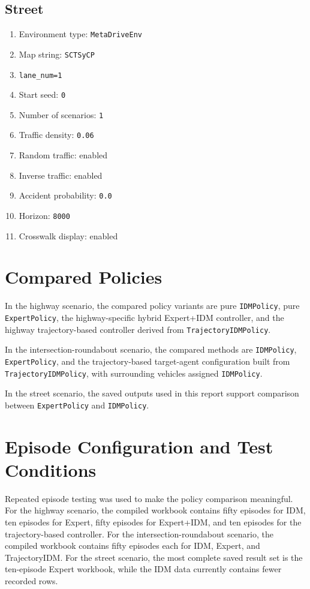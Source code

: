 \documentclass[12pt,a4paper]{report}
\begin{document}
\subsection{Street}
\begin{enumerate}[label=\arabic*.]
    \item Environment type: \texttt{MetaDriveEnv}
    \item Map string: \texttt{SCTSyCP}
    \item \texttt{lane\_num=1}
    \item Start seed: \texttt{0}
    \item Number of scenarios: \texttt{1}
    \item Traffic density: \texttt{0.06}
    \item Random traffic: enabled
    \item Inverse traffic: enabled
    \item Accident probability: \texttt{0.0}
    \item Horizon: \texttt{8000}
    \item Crosswalk display: enabled
\end{enumerate}

\section{Compared Policies}
In the highway scenario, the compared policy variants are pure \texttt{IDMPolicy}, pure \texttt{ExpertPolicy}, the highway-specific hybrid Expert+IDM controller, and the highway trajectory-based controller derived from \texttt{TrajectoryIDMPolicy}.

In the intersection-roundabout scenario, the compared methods are \texttt{IDMPolicy}, \texttt{ExpertPolicy}, and the trajectory-based target-agent configuration built from \texttt{TrajectoryIDMPolicy}, with surrounding vehicles assigned \texttt{IDMPolicy}.

In the street scenario, the saved outputs used in this report support comparison between \texttt{ExpertPolicy} and \texttt{IDMPolicy}.

\section{Episode Configuration and Test Conditions}
Repeated episode testing was used to make the policy comparison meaningful. For the highway scenario, the compiled workbook contains fifty episodes for IDM, ten episodes for Expert, fifty episodes for Expert+IDM, and ten episodes for the trajectory-based controller. For the intersection-roundabout scenario, the compiled workbook contains fifty episodes each for IDM, Expert, and TrajectoryIDM. For the street scenario, the most complete saved result set is the ten-episode Expert workbook, while the IDM data currently contains fewer recorded rows.
\end{document}
